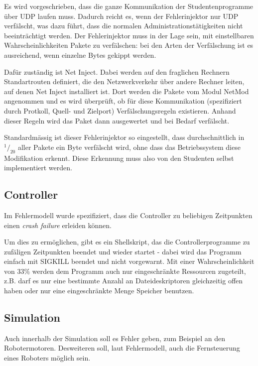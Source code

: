 Es wird vorgeschrieben, dass die ganze Kommunikation der Studentenprogramme {\"{u}}ber UDP laufen muss. Dadurch reicht es, wenn der Fehlerinjektor nur UDP verf{\"{a}}lscht, was dazu
f{\"{u}}hrt, dass die normalen Administrationst{\"{a}}tigkeiten nicht beeintr{\"{a}}chtigt werden. Der Fehlerinjektor muss in der Lage sein, mit einstellbaren Wahrscheinlichkeiten
Pakete zu verf{\"{a}}lschen: bei den Arten der Verf{\"{a}}lschung ist es ausreichend, wenn einzelne Bytes gekippt werden.

Daf{\"{u}}r zust{\"{a}}ndig ist Net Inject\cite{kubertzki}. Dabei werden auf den fraglichen Rechnern
Standartrouten definiert, die den Netzwerkverkehr {\"{u}}ber andere Rechner leiten, auf denen Net Inject
installiert ist. Dort werden die Pakete vom Modul NetMod angenommen und es wird {\"{u}}berpr{\"{u}}ft, ob
f{\"{u}}r diese Kommunikation (spezifiziert durch Protkoll, Quell- und Zielport) Verf{\"{a}}lschungsregeln
existieren. Anhand dieser Regeln wird das Paket dann ausgewertet und bei Bedarf verf{\"{a}}lscht.

Standardm{\"{a}}ssig ist dieser Fehlerinjektor so eingestellt, dass durchschnittlich in $ ^1/_{20} $ aller Pakete ein Byte verf{\"{a}}lscht wird,
ohne dass das Betriebssystem diese Modifikation erkennt. Diese Erkennung muss also von den Studenten selbst implementiert werden.

\subsection{Controller}
Im Fehlermodell wurde spezifiziert, dass die Controller zu beliebigen Zeitpunkten einen
\textit{crash failure} erleiden k{\"{o}}nnen.

Um dies zu erm{\"{o}}glichen, gibt es ein Shellskript, das die Controllerprogramme zu zuf{\"{a}}ligen Zeitpunkten 
beendet und wieder startet - dabei wird das Programm einfach mit SIGKILL beendet und nicht vorgewarnt.
Mit einer Wahrscheinlichkeit von 33\% werden dem Programm auch nur eingeschr{\"{a}}nkte Ressourcen zugeteilt,
z.B. darf es nur eine bestimmte Anzahl an Dateideskriptoren gleichzeitig offen haben oder nur eine 
eingeschr{\"{a}}nkte Menge Speicher benutzen.


\subsection{Simulation}
Auch innerhalb der Simulation soll es Fehler geben, zum Beispiel an den Robotermotoren. Desweiteren soll,
laut Fehlermodell, auch die Fernsteuerung eines Roboters m{\"{o}}glich sein.

